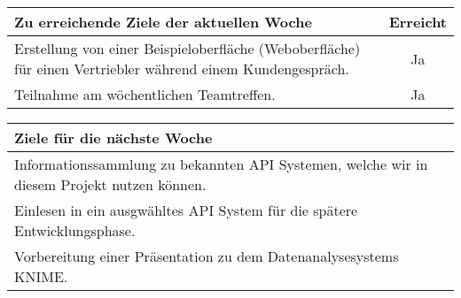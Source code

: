 \begin{tabularx}{\textwidth}{Xc}
    \arrayrulecolor{OliveGreen}
    \toprule
    {\bfseries Zu erreichende Ziele der aktuellen Woche} & {\bfseries Erreicht} \\
    \midrule[2pt]
    Erstellung von einer Beispieloberfläche (Weboberfläche) für einen 
	Vertriebler während einem Kundengespräch.			&Ja        \\
    \rowcolor{OliveGreen!15}
    Teilnahme am wöchentlichen Teamtreffen.			  &Ja           \\
    \bottomrule[2pt]
\end{tabularx}
%
\vspace{1cm}
%
\begin{tabularx}{\textwidth}{Xc}
    \arrayrulecolor{OliveGreen}
    \toprule
    {\bfseries Ziele für die nächste Woche}              &                      \\
    \midrule[2pt]
    Informationssammlung zu bekannten API Systemen, welche wir in diesem Projekt nutzen können.                               &                      \\
    \rowcolor{OliveGreen!15}
    Einlesen in ein ausgwähltes API System für die spätere Entwicklungsphase.                             &                      \\
    \rowcolor{White}
    Vorbereitung einer Präsentation zu dem Datenanalysesystems KNIME. & \\
\end{tabularx}
